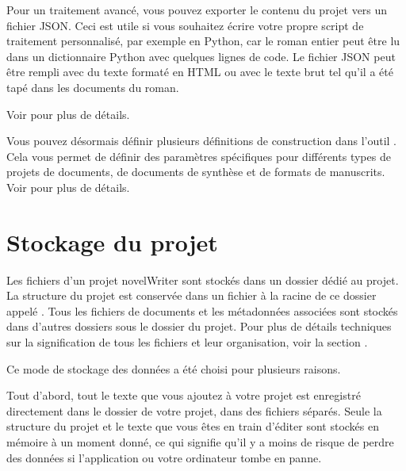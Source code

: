 \documentclass[a4paper,11pt,french]{sphinxmanual}
\begin{document}
\sphinxAtStartPar
Pour un traitement avancé, vous pouvez exporter le contenu du projet vers un fichier JSON. Ceci est utile si vous souhaitez écrire votre propre script de traitement personnalisé, par exemple en Python, car le roman entier peut être lu dans un dictionnaire Python avec quelques lignes de code. Le fichier JSON peut être rempli avec du texte formaté en HTML ou avec le texte brut tel qu’il a été tapé dans les documents du roman.

\sphinxAtStartPar
Voir {\hyperref[\detokenize{project_manuscript:a-manuscript}]{}} pour plus de détails.

\sphinxAtStartPar
{}Vous pouvez désormais définir plusieurs définitions de construction dans l’outil . Cela vous permet de définir des paramètres spécifiques pour différents types de projets de documents, de documents de synthèse et de formats de manuscrits. Voir {\hyperref[\detokenize{project_manuscript:a-manuscript}]{}} pour plus de détails.


\section{Stockage du projet}
\label{\detokenize{usage_breakdown:project-storage}}\label{\detokenize{usage_breakdown:a-breakdown-storage}}
\sphinxAtStartPar
Les fichiers d’un projet novelWriter sont stockés dans un dossier dédié au projet. La structure du projet est conservée dans un fichier à la racine de ce dossier appelé . Tous les fichiers de documents et les métadonnées associées sont stockés dans d’autres dossiers sous le dossier du projet. Pour plus de détails techniques sur la signification de tous les fichiers et leur organisation, voir la section {\hyperref[\detokenize{tech_storage:a-storage}]{}}.

\sphinxAtStartPar
Ce mode de stockage des données a été choisi pour plusieurs raisons.

\sphinxAtStartPar
Tout d’abord, tout le texte que vous ajoutez à votre projet est enregistré directement dans le dossier de votre projet, dans des fichiers séparés. Seule la structure du projet et le texte que vous êtes en train d’éditer sont stockés en mémoire à un moment donné, ce qui signifie qu’il y a moins de risque de perdre des données si l’application ou votre ordinateur tombe en panne.
\end{document}
